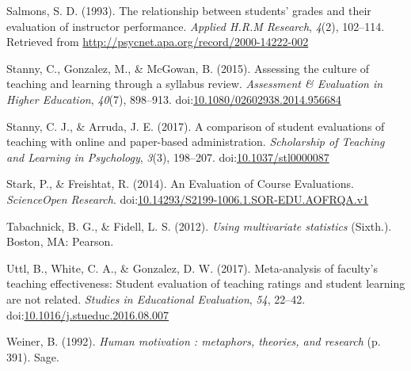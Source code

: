 \documentclass[,man]{apa6}
\theoremstyle{definition}
\theoremstyle{definition}
\theoremstyle{definition}
\theoremstyle{remark}
\begin{document}
\leavevmode\hypertarget{ref-Salmons1993}{}%
Salmons, S. D. (1993). The relationship between students' grades and
their evaluation of instructor performance. \emph{Applied H.R.M
Research}, \emph{4}(2), 102--114. Retrieved from
\url{http://psycnet.apa.org/record/2000-14222-002}

\leavevmode\hypertarget{ref-Stanny2015}{}%
Stanny, C., Gonzalez, M., \& McGowan, B. (2015). Assessing the culture
of teaching and learning through a syllabus review. \emph{Assessment \&
Evaluation in Higher Education}, \emph{40}(7), 898--913.
doi:\href{https://doi.org/10.1080/02602938.2014.956684}{10.1080/02602938.2014.956684}

\leavevmode\hypertarget{ref-Stanny2017}{}%
Stanny, C. J., \& Arruda, J. E. (2017). A comparison of student
evaluations of teaching with online and paper-based administration.
\emph{Scholarship of Teaching and Learning in Psychology}, \emph{3}(3),
198--207.
doi:\href{https://doi.org/10.1037/stl0000087}{10.1037/stl0000087}

\leavevmode\hypertarget{ref-Stark2014}{}%
Stark, P., \& Freishtat, R. (2014). An Evaluation of Course Evaluations.
\emph{ScienceOpen Research}.
doi:\href{https://doi.org/10.14293/S2199-1006.1.SOR-EDU.AOFRQA.v1}{10.14293/S2199-1006.1.SOR-EDU.AOFRQA.v1}

\leavevmode\hypertarget{ref-Tabachnick2012}{}%
Tabachnick, B. G., \& Fidell, L. S. (2012). \emph{Using multivariate
statistics} (Sixth.). Boston, MA: Pearson.

\leavevmode\hypertarget{ref-Uttl2017}{}%
Uttl, B., White, C. A., \& Gonzalez, D. W. (2017). Meta-analysis of
faculty's teaching effectiveness: Student evaluation of teaching ratings
and student learning are not related. \emph{Studies in Educational
Evaluation}, \emph{54}, 22--42.
doi:\href{https://doi.org/10.1016/j.stueduc.2016.08.007}{10.1016/j.stueduc.2016.08.007}

\leavevmode\hypertarget{ref-Weiner1992}{}%
Weiner, B. (1992). \emph{Human motivation : metaphors, theories, and
research} (p. 391). Sage.
\end{document}
